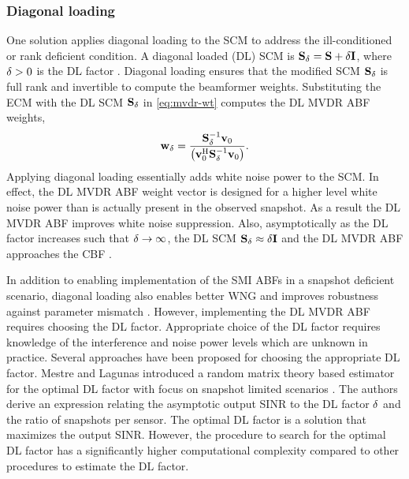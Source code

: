 \subsubsection{Diagonal loading}
\label{sec:diagonal-loading}
One solution applies diagonal loading to the SCM to address the
ill-conditioned or rank deficient condition. A diagonal loaded (DL)
SCM is ${\bf S}_\delta = {\bf S} + \delta{\bf I}{}$, where $\delta > 0$ is the
DL factor \cite{Carlson1988scm}. Diagonal loading ensures that the
modified SCM ${\bf S}_{\delta}$ is full rank and invertible to compute
the beamformer weights. Substituting the ECM with the DL SCM
${\bf S}_{\delta}$ in \eqref{eq:mvdr-wt} computes the DL MVDR ABF
weights,
\begin{equation*} 
    \label{eq:dlmvdr}
{\bf {\bf w}}_{\delta} = \frac{{\bf S}_{\delta}^{-1} {\bf v}_0}{\left({\bf v}_0^{\rm H}
{\bf S}_{\delta}^{-1} {\bf v}_0 \right)}.
\end{equation*}
Applying diagonal loading essentially adds white noise power to the SCM. In
effect, the DL MVDR ABF weight vector is designed for a higher level
white noise power than is actually present in the observed
snapshot. As a result the DL MVDR ABF improves white noise suppression. Also, asymptotically as the DL factor increases such that
$\delta \rightarrow \infty$,
the DL SCM ${\bf S}_\delta \approx \delta{\bf I}$
and the DL MVDR ABF approaches the CBF \cite{vtree2002oap}.

In addition to enabling implementation of the SMI ABFs in a snapshot
deficient scenario, diagonal loading also enables better WNG and
improves robustness against parameter mismatch \cite{vtree2002oap,
  mestre2005diagonal}. However, implementing the DL MVDR ABF requires
choosing the DL factor. Appropriate choice of the DL factor requires
knowledge of the interference and noise power levels which are unknown
in practice. Several approaches have been proposed for choosing the
appropriate DL factor. Mestre and Lagunas introduced a random matrix
theory based estimator for the optimal DL factor with focus on
snapshot limited scenarios \cite{mestre2005diagonal}. The authors
derive an expression relating the asymptotic output SINR to the DL
factor $\delta$ and the ratio of snapshots per sensor. The optimal DL
factor is a solution that maximizes the output SINR. However, the
procedure to search for the optimal DL factor has a significantly
higher computational complexity compared to other procedures to
estimate the DL factor.


